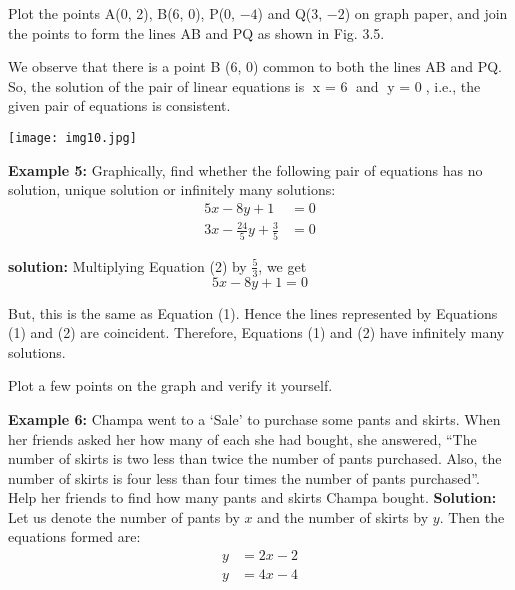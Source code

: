 \documentclass{article}
\begin{document}
\vspace{-1em}
\noindent
\begin{minipage}{0.5\textwidth}
\hspace{2em}
{\fontsize{14}{16}\selectfont
Plot the points A(0, 2), B(6, 0), P(0, $-4$) and Q(3, $-2$) on graph paper, and join the points to form the lines AB and PQ as shown in Fig. 3.5.

\vspace{1em}
\hspace{2em}
We observe that there is a point B (6, 0) common to both the lines AB and PQ. So, the solution of the pair of linear equations is x = 6 and y = 0, i.e., the given pair of equations is consistent.}
\end{minipage}
\begin{minipage}{0.5\textwidth}
    \texttt{[image: img10.jpg]}
\end{minipage}
\newpage
\pagestyle{fancy}
\fancyhf{} %
\textbf{\textcolor{ncertcyan}{Example 5:}} Graphically, find whether the following pair of equations has no solution, unique solution or infinitely many solutions:
\begin{align*}
5x - 8y + 1 &= 0 \tag{1} \\
3x - \frac{24}{5}y + \frac{3}{5} &= 0 \tag{2}
\end{align*}

\textbf{\textcolor{ncertcyan}{solution:}} Multiplying Equation (2) by $\frac{5}{3}$, we get
\[
5x - 8y + 1 = 0
\]

But, this is the same as Equation (1). Hence the lines represented by Equations (1) and (2) are coincident. Therefore, Equations (1) and (2) have infinitely many solutions.

Plot a few points on the graph and verify it yourself.

\vspace{0.5cm}
\textbf{\textcolor{ncertcyan}{Example 6:}} Champa went to a ‘Sale’ to purchase some pants and skirts. When her friends asked her how many of each she had bought, she answered, “The number of skirts is two less than twice the number of pants purchased. Also, the number of skirts is four less than four times the number of pants purchased”. Help her friends to find how many pants and skirts Champa bought.
\textbf{\textcolor{ncertcyan}{Solution:}} Let us denote the number of pants by $x$ and the number of skirts by $y$. Then the equations formed are:
\begin{align*}
y &= 2x - 2 \tag{1} \\
y &= 4x - 4 \tag{2}
\end{align*}
\end{document}
